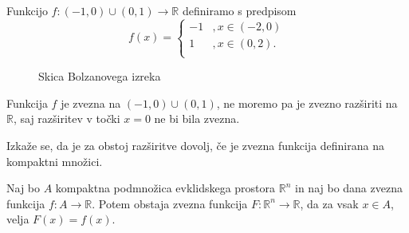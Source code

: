 \documentclass[mat1]{fmfdelo}
\newcommand{\R}{\mathbb R}
\newcommand{\0}{\underline{0}}
\begin{document}
\begin{primer}
Funkcijo $f : (-1, 0) \cup (0, 1) \to \R$ definiramo s predpisom
\[  f(x) = \left \{
\begin{array}{ll}
	-1 &, x \in (-2, 0)\\
	1 &, x \in (0, 2). \\
\end{array} 
\right. \]

\begin{figure}[h!]
	\centering
	\caption{Skica Bolzanovega izreka}
\end{figure}

Funkcija $f$ je zvezna na $(-1, 0) \cup (0, 1)$, ne moremo pa je zvezno razširiti na $\R$, saj razširitev v točki $x = 0$ ne bi bila zvezna.
\end{primer}

Izkaže se, da je za obstoj razširitve dovolj, če je zvezna funkcija definirana na kompaktni množici.

\begin{lema}\label{lem:razsiritev}
Naj bo $A$ kompaktna podmnožica evklidskega prostora $\R^n$ in naj bo dana zvezna funkcija $f : A \to \R$. Potem obstaja zvezna funkcija $F : \R^n \to \R$, da za vsak $x \in A$, velja $F(x) = f(x)$.
\end{lema}
\end{document}
